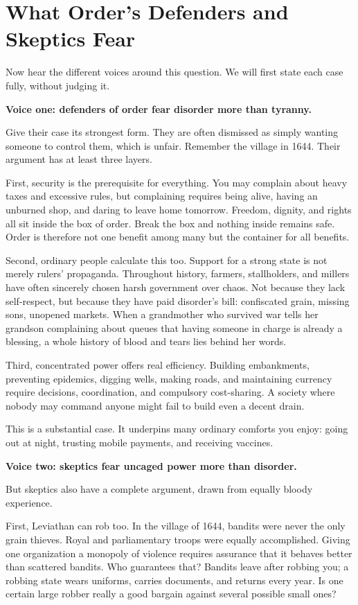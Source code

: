 \section{What Order's Defenders and Skeptics Fear}
Now hear the different voices around this question. We will first state each case fully, without judging it.

\textbf{Voice one: defenders of order fear disorder more than tyranny.}

Give their case its strongest form. They are often dismissed as simply wanting someone to control them, which is unfair. Remember the village in 1644. Their argument has at least three layers.

First, security is the prerequisite for everything. You may complain about heavy taxes and excessive rules, but complaining requires being alive, having an unburned shop, and daring to leave home tomorrow. Freedom, dignity, and rights all sit inside the box of order. Break the box and nothing inside remains safe. Order is therefore not one benefit among many but the container for all benefits.

Second, ordinary people calculate this too. Support for a strong state is not merely rulers' propaganda. Throughout history, farmers, stallholders, and millers have often sincerely chosen harsh government over chaos. Not because they lack self-respect, but because they have paid disorder's bill: confiscated grain, missing sons, unopened markets. When a grandmother who survived war tells her grandson complaining about queues that having someone in charge is already a blessing, a whole history of blood and tears lies behind her words.

Third, concentrated power offers real efficiency. Building embankments, preventing epidemics, digging wells, making roads, and maintaining currency require decisions, coordination, and compulsory cost-sharing. A society where nobody may command anyone might fail to build even a decent drain.

This is a substantial case. It underpins many ordinary comforts you enjoy: going out at night, trusting mobile payments, and receiving vaccines.

\textbf{Voice two: skeptics fear uncaged power more than disorder.}

But skeptics also have a complete argument, drawn from equally bloody experience.

First, Leviathan can rob too. In the village of 1644, bandits were never the only grain thieves. Royal and parliamentary troops were equally accomplished. Giving one organization a monopoly of violence requires assurance that it behaves better than scattered bandits. Who guarantees that? Bandits leave after robbing you; a robbing state wears uniforms, carries documents, and returns every year. Is one certain large robber really a good bargain against several possible small ones?

